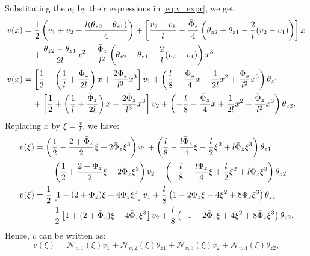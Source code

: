 \documentclass[a4paper,11pt]{article}
\begin{document}
\noindent Substituting the $a_i$ by their expressions in \eqref{eq:v_expr}, we get
\begin{align*}
v(x) & = \frac{1}{2} \left( v_1 + v_2 - \frac{l(\theta_{z2} - \theta_{z1})}{4} \right) + \left[ \frac{v_2 - v_1}{l} - \frac{\bar{\Phi}_z}{4} \left( \theta_{z2} + \theta_{z1} -\frac{2}{l}(v_2-v_1) \right) \right] x \\
	& \text{\hspace{4mm}} + \frac{\theta_{z2} - \theta_{z1}}{2l} x^2 + \frac{\bar{\Phi}_z}{l^2} \left( \theta_{z2} + \theta_{z1} -\frac{2}{l}(v_2-v_1) \right) x^3 \\
v(x) & = \left[ \frac{1}{2} - \left( \frac{1}{l} + \frac{\bar{\Phi}_z}{2l} \right) x + \frac{2\bar{\Phi}_z}{l^3}x^3 \right]v_1 + \left( \frac{l}{8} - \frac{\bar{\Phi}_z}{4}x - \frac{1}{2l}x^2 + \frac{\bar{\Phi}_z}{l^2}x^3 \right)\theta_{z1} \\
	& \text{\hspace{4mm}} + \left[ \frac{1}{2} + \left( \frac{1}{l} + \frac{\bar{\Phi}_z}{2l}\right)x - \frac{2\bar{\Phi}_z}{l^3}x^3 \right]v_2 + \left( -\frac{l}{8} - \frac{\bar{\Phi}_z}{4}x + \frac{1}{2l}x^2 + \frac{\bar{\Phi}_z}{l^2}x^3 \right)\theta_{z2}.
\end{align*}
Replacing $x$ by $\xi = \frac{x}{l}$, we have:
\begin{align}
	v(\xi) & = \left( \frac{1}{2} - \frac{2 + \bar{\Phi}_z}{2}\xi + 2\bar{\Phi}_z\xi^3 \right)v_1 + \left( \frac{l}{8} - \frac{l\bar{\Phi}_z}{4}\xi - \frac{l}{2}\xi^2 + l\bar{\Phi}_z\xi^3 \right)\theta_{z1} \nonumber\\
		& \text{\hspace{4mm}} + \left( \frac{1}{2} + \frac{2 + \bar{\Phi}_z}{2}\xi - 2\bar{\Phi}_z\xi^3 \right)v_2 + \left( -\frac{l}{8} - \frac{l\bar{\Phi}_z}{4}\xi + \frac{l}{2}\xi^2 + l\bar{\Phi}_z\xi^3 \right)\theta_{z2} \nonumber\\
	v(\xi) & = \frac{1}{2} \left[1 - (2 + \bar{\Phi}_z)\xi + 4\bar{\Phi}_z\xi^3 \right] v_1 + \frac{l}{8}\left(1 - 2\bar{\Phi}_z\xi - 4\xi^2 + 8\bar{\Phi}_z\xi^3 \right) \theta_{z1} \nonumber\\
		& \text{\hspace{4mm}} + \frac{1}{2} \left[1 + (2 + \bar{\Phi}_z)\xi - 4\bar{\Phi}_z\xi^3 \right] v_2 + \frac{l}{8}\left( -1 - 2\bar{\Phi}_z\xi + 4\xi^2 + 8\bar{\Phi}_z\xi^3 \right) \theta_{z2}.
\end{align}
Hence, $v$ can be written as:
\begin{equation} \label{eq:v_expr_final}
	v(\xi) = \mathcal{N}_{v,1}(\xi)v_1 + \mathcal{N}_{v,2}(\xi)\theta_{z1} + \mathcal{N}_{v,3}(\xi)v_2 + \mathcal{N}_{v,4}(\xi)\theta_{z2},
\end{equation}
\end{document}
